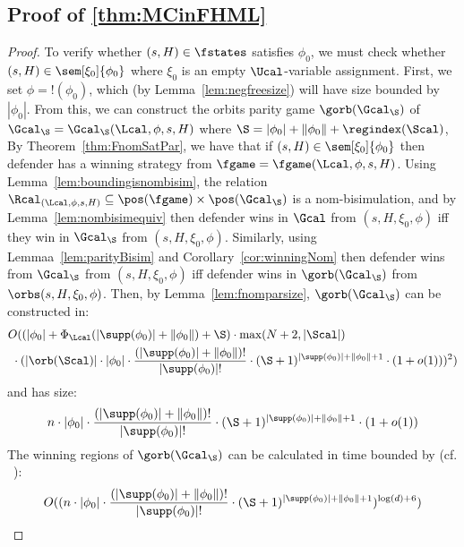 \subsection{Proof of \cref{thm:MCinFHML}}
\MCinFHML*
  \begin{proof}
To verify whether $(s, H) \in \fstates$ satisfies $\phi_0$, we must check whether $(s, H) \in \sem[\xi_0]{\phi_0}$ where $\xi_0$ is an empty $\Ucal$-variable assignment. 
First, we set $\phi = !(\phi_0)$, which (by Lemma~\ref{lem:negfreesize}) will have size bounded by $|\phi_0|$. 
From this, we can construct the orbits parity game $\gorb(\Gcal_\S)$ of $\Gcal_\S = \Gcal_\S(\Lcal, \phi, s, H)$ where $\S = |\phi_0| + \|\phi_0\| + \regindex(\Scal)$, 
By Theorem~\ref{thm:FnomSatPar}, we have that if $(s, H) \in \sem[\xi_0]{\phi_0}$ then defender has a winning strategy from $\fgame = \fgame(\Lcal, \phi, s, H)$.
Using Lemma~\ref{lem:boundingisnombisim}, the relation $\Rcal_{(\Lcal, \phi, s, H)} \subseteq \pos(\fgame) \times \pos(\Gcal_\S)$ is a nom-bisimulation, 
and by Lemma~\ref{lem:nombisimequiv} then defender wins in $\Gcal$ from $(s, H, \xi_0, \phi)$ iff they win in $\Gcal_\S$ from $(s, H, \xi_0, \phi)$.
Similarly, using Lemmaa~\ref{lem:parityBisim} and Corollary~\ref{cor:winningNom} then defender wins from $\Gcal_\S$ from $(s, H, \xi_0, \phi)$ iff defender wins in $\gorb(\Gcal_\S)$ from $\orbs(s, H, \xi_0, \phi)$. 
Then, by Lemma~\ref{lem:fnomparsize}, $\gorb(\Gcal_\S)$ can be constructed in:
    \begin{align*}
	&O(
	(|\phi_0| + \Phi_\Lcal(|\supp(\phi_0)| + \|\phi_0\|) + \S)
	\cdot
	\max(N + 2, |\Scal|
	) \\&\ \cdot 
	(|\orb(\Scal)| \cdot|\phi_0|\cdot \frac{(|\supp(\phi_0)|+\|\phi_0\|)!}{|\supp(\phi_0)|!}\cdot (\S + 1)^{|\supp(\phi_0)| + \|\phi_0\| + 1}\cdot(1+o(1)))
	^2)
\end{align*}
and has size:
\[
n \cdot|\phi_0|\cdot \frac{(|\supp(\phi_0)|+\|\phi_0\|)!}{|\supp(\phi_0)|!}\cdot (\S + 1)^{|\supp(\phi_0)| + \|\phi_0\| + 1}\cdot(1+o(1))
\]
The winning regions of $\gorb(\Gcal_\S)$ can be calculated in time bounded by (cf.
~\cite{CaludeJKLS22}):
\[
O((n \cdot|\phi_0|\cdot \frac{(|\supp(\phi_0)| + \|\phi_0\|)!}{|\supp(\phi_0)|!}\cdot (\S + 1)^{|\supp(\phi_0)| + \|\phi_0\| + 1})^{\log(d) + 6})
\]


\end{proof}
